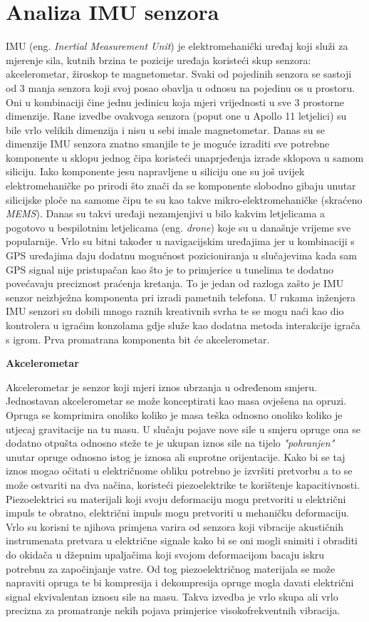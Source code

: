 \documentclass[times, utf8, diplomski]{fer}
\begin{document}
\chapter{Analiza IMU senzora}
IMU (eng. \textit{Inertial Measurement Unit}) je elektromehanički uređaj koji služi za mjerenje sila, kutnih brzina te pozicije
uređaja koristeći skup senzora: akcelerometar, žiroskop te magnetometar. Svaki od pojedinih senzora se sastoji od 3 manja senzora
koji svoj posao obavlja u odnosu na pojedinu os u prostoru. Oni u kombinaciji čine jednu jedinicu koja mjeri vrijednosti u sve 
3 prostorne dimenzije. Rane izvedbe ovakvoga senzora (poput one u Apollo 11 letjelici) su bile vrlo velikih dimenzija i nisu
u sebi imale magnetometar. Danas su se dimenzije IMU senzora znatno smanjile te je moguće izraditi sve potrebne komponente u
sklopu jednog čipa koristeći unaprjeđenja izrade sklopova u samom siliciju. Iako komponente jesu napravljene u siliciju one su
još uvijek elektromehaničke po prirodi što znači da se komponente slobodno gibaju unutar silicijske ploče na samome čipu
te su kao takve mikro-elektromehaničke (skraćeno \textit{MEMS}). Danas su takvi uređaji nezamjenjivi u bilo kakvim letjelicama a
pogotovo u bespilotnim letjelicama (eng. \textit{drone}) koje su u današnje vrijeme sve popularnije. Vrlo su bitni također u
navigacijskim uređajima jer u kombinaciji s GPS uređajima daju dodatnu mogućnost pozicioniranja u slučajevima kada sam GPS signal
nije pristupačan kao što je to primjerice u tunelima te dodatno povećavaju preciznost praćenja kretanja. To je jedan od razloga
zašto je IMU senzor neizbježna komponenta pri izradi pametnih telefona. U rukama inženjera IMU senzori su dobili mnogo raznih 
kreativnih svrha te se mogu naći kao dio kontrolera u igraćim konzolama gdje služe kao dodatna metoda interakcije igrača s igrom.
Prva promatrana komponenta bit će akcelerometar.

\textbf{Akcelerometar}

Akcelerometar je senzor koji mjeri iznos ubrzanja u određenom smjeru. Jednostavan akcelerometar se može konceptirati kao masa ovješena na 
opruzi. Opruga se komprimira onoliko koliko je masa teška odnosno onoliko koliko je utjecaj gravitacije na tu masu. U slučaju
pojave nove sile u smjeru opruge ona se dodatno otpušta odnosno steže te je ukupan iznos sile na tijelo \textit{"pohranjen"}
unutar opruge odnosno istog je iznosa ali suprotne orijentacije. Kako bi se taj iznos mogao očitati u električnome obliku potrebno
je izvršiti pretvorbu a to se može ostvariti na dva načina, koristeći piezoelektrike te korištenje kapacitivnosti. Piezoelektrici
su materijali koji svoju deformaciju mogu pretvoriti u električni impuls te obratno, električni impuls mogu pretvoriti u mehaničku
deformaciju. Vrlo su korisni te njihova primjena varira od senzora koji vibracije akustičnih instrumenata pretvara u električne
signale kako bi se oni mogli snimiti i obraditi do okidača u džepnim upaljačima koji svojom deformacijom bacaju iskru potrebnu za
započinjanje vatre. Od tog piezoelektričnog materijala se može napraviti opruga te bi kompresija i dekompresija opruge mogla davati
električni signal ekvivalentan iznosu sile na masu. Takva izvedba je vrlo skupa ali vrlo precizna za promatranje nekih pojava 
primjerice visokofrekventnih vibracija.
\end{document}
